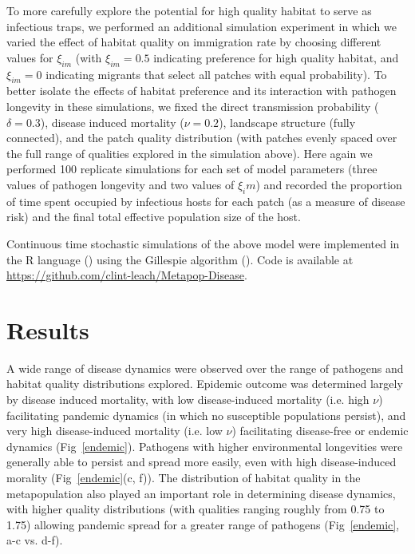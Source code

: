 \documentclass{article}
\begin{document}
To more carefully explore the potential for high quality habitat to serve as infectious traps, we performed an additional simulation experiment in which we varied the effect of habitat quality on immigration rate by choosing different values for $\xi_{im}$ (with $\xi_{im} = 0.5$ indicating preference for high quality habitat, and  $\xi_{im} = 0$ indicating migrants that select all patches with equal probability).  To better isolate the effects of habitat preference and its interaction with pathogen longevity in these simulations, we fixed the direct transmission probability ($\delta = 0.3$), disease induced mortality ($\nu = 0.2$), landscape structure (fully connected), and the patch quality distribution (with patches evenly spaced over the full range of qualities explored in the simulation above).  Here again we performed 100 replicate simulations for each set of model parameters (three values of pathogen longevity and two values of $\xi_im$) and recorded the proportion of time spent occupied by infectious hosts for each patch (as a measure of disease risk) and the final total effective population size of the host.

Continuous time stochastic simulations of the above model were implemented in the R language (\cite{R2014}) using the Gillespie algorithm (\cite{Gillespie1977}).  Code is available at \url{https://github.com/clint-leach/Metapop-Disease}.

\section{Results}
\label{results}

A wide range of disease dynamics were observed over the range of pathogens and habitat quality distributions explored.  
Epidemic outcome was determined largely by disease induced mortality, with low disease-induced mortality (i.e. high $\nu$) facilitating pandemic dynamics (in which no susceptible populations persist), and very high disease-induced mortality (i.e. low $\nu$) facilitating disease-free or endemic dynamics (Fig~\ref{endemic}). 
Pathogens with higher environmental longevities were generally able to persist and spread more easily, even with high disease-induced morality (Fig~\ref{endemic}(c, f)).  
The distribution of habitat quality in the metapopulation also played an important role in determining disease dynamics, with higher quality distributions (with qualities ranging roughly from 0.75 to 1.75) allowing pandemic spread for a greater range of pathogens (Fig~\ref{endemic}, a-c vs. d-f).
\end{document}
